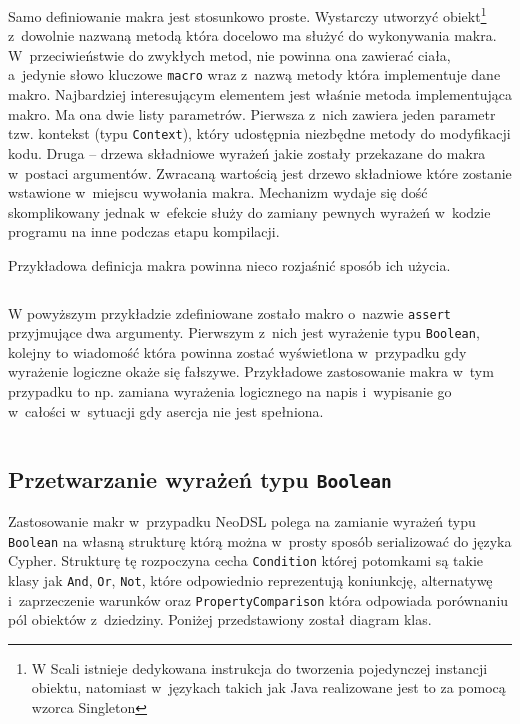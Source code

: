 \documentclass{xmgr}
\begin{document}
Samo definiowanie makra jest stosunkowo proste. Wystarczy utworzyć obiekt\footnote{W Scali istnieje dedykowana instrukcja do tworzenia pojedynczej instancji obiektu, natomiast w~językach takich jak Java realizowane jest to za pomocą wzorca Singleton} z~dowolnie nazwaną metodą która docelowo ma służyć do wykonywania makra. W~przeciwieństwie do zwykłych metod, nie powinna ona zawierać ciała, a~jedynie słowo kluczowe \texttt{macro} wraz z~nazwą metody która implementuje dane makro. Najbardziej interesującym elementem jest właśnie metoda implementująca makro. Ma ona dwie listy parametrów. Pierwsza z~nich zawiera jeden parametr tzw. kontekst (typu \texttt{Context}), który udostępnia niezbędne metody do modyfikacji kodu. Druga --  drzewa składniowe wyrażeń jakie zostały przekazane do makra w~postaci argumentów. Zwracaną wartością jest drzewo składniowe które zostanie wstawione w~miejscu wywołania makra. Mechanizm wydaje się dość skomplikowany jednak w~efekcie służy do zamiany pewnych wyrażeń w~kodzie programu na inne podczas etapu kompilacji.

\medskip\noindent Przykładowa definicja makra powinna nieco rozjaśnić sposób ich użycia.

\newpage

\inputminted{scala}{listings/scala/macro-sample.scala}

W powyższym przykładzie zdefiniowane zostało makro o~nazwie \texttt{assert} przyjmujące dwa argumenty. Pierwszym z~nich jest wyrażenie typu \texttt{Boolean}, kolejny to wiadomość która powinna zostać wyświetlona w~przypadku gdy wyrażenie logiczne okaże się fałszywe. Przykładowe zastosowanie makra w~tym przypadku to np. zamiana wyrażenia logicznego na napis i~wypisanie go w~całości w~sytuacji gdy asercja nie jest spełniona.

\inputminted{scala}{listings/scala/macro-usage-assert.scala}

\newpage

\subsection{Przetwarzanie wyrażeń typu \texttt{Boolean}}

Zastosowanie makr w~przypadku NeoDSL polega na zamianie wyrażeń typu \texttt{Boolean} na własną strukturę którą można w~prosty sposób serializować do języka Cypher. 
Strukturę tę rozpoczyna cecha \texttt{Condition} której potomkami są takie klasy jak \texttt{And}, \texttt{Or}, \texttt{Not}, które odpowiednio reprezentują koniunkcję, alternatywę i~zaprzeczenie warunków oraz \texttt{PropertyComparison} która odpowiada porównaniu pól obiektów z~dziedziny. Poniżej przedstawiony został diagram klas.
\end{document}
